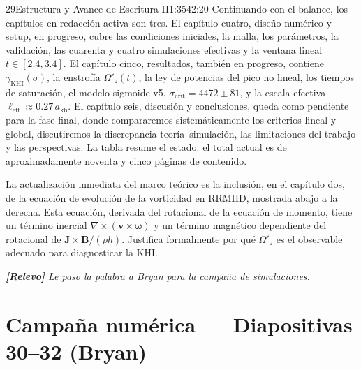 \documentclass[11pt,a4paper]{article}
\newcommand{\relevo}[1]{%
  \par\medskip
  \noindent\colorbox{tagbg}{\parbox{\dimexpr\linewidth-2\fboxsep\relax}{%
    \small\itshape \textbf{[Relevo]} #1}}\par\medskip}
\begin{document}
\begin{seborador}{29}{Estructura y Avance de Escritura II}{1:35}{42:20}
Continuando con el balance, los capítulos en redacción activa son tres. El
capítulo cuatro, diseño numérico y setup, en progreso, cubre las condiciones
iniciales, la malla, los parámetros, la validación, las cuarenta y cuatro
simulaciones efectivas y la ventana lineal $t\in[2.4,3.4]$. El capítulo
cinco, resultados, también en progreso, contiene $\gamma_\text{KHI}(\sigma)$,
la enstrofía $\Omega'_z(t)$, la ley de potencias del pico no lineal, los
tiempos de saturación, el modelo sigmoide v5, $\sigma_\text{crit}=4472\pm 81$,
y la escala efectiva $\ell_\text{eff}\approx 0.27\,a_\text{kh}$. El capítulo
seis, discusión y conclusiones, queda como pendiente para la fase final,
donde compararemos sistemáticamente los criterios lineal y global,
discutiremos la discrepancia teoría--simulación, las limitaciones del trabajo
y las perspectivas. La tabla resume el estado: el total actual es de
aproximadamente noventa y cinco páginas de contenido.

La actualización inmediata del marco teórico es la inclusión, en el capítulo
dos, de la ecuación de evolución de la vorticidad en RRMHD, mostrada abajo a
la derecha. Esta ecuación, derivada del rotacional de la ecuación de momento,
tiene un término inercial $\nabla\times(\mathbf{v}\times\boldsymbol\omega)$ y
un término magnético dependiente del rotacional de
$\mathbf{J}\times\mathbf{B}/(\rho h)$. Justifica formalmente por qué
$\Omega'_z$ es el observable adecuado para diagnosticar la KHI.
\relevo{Le paso la palabra a Bryan para la campaña de simulaciones.}
\end{seborador}

\section{Campaña numérica --- Diapositivas 30--32 (Bryan)}
\end{document}
